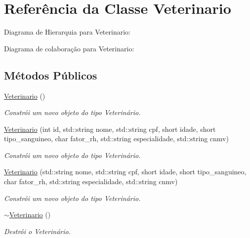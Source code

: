 \hypertarget{classVeterinario}{}\section{Referência da Classe Veterinario}
\label{classVeterinario}


Diagrama de Hierarquia para Veterinario\+:


Diagrama de colaboração para Veterinario\+:
\subsection*{Métodos Públicos}
\begin{DoxyCompactItemize}
\item 
\mbox{\label{classVeterinario_af8dc5f6f77bf8c70dd94d54766764134}} 
\hyperlink{classVeterinario_af8dc5f6f77bf8c70dd94d54766764134}{Veterinario} ()
\begin{DoxyCompactList}\small\item\em Constrói um novo objeto do tipo Veterinário. \end{DoxyCompactList}\item 
\hyperlink{classVeterinario_aff0d07b973488e857d796c98adf9969a}{Veterinario} (int id, std\+::string nome, std\+::string cpf, short idade, short tipo\+\_\+sanguineo, char fator\+\_\+rh, std\+::string especialidade, std\+::string cnmv)
\begin{DoxyCompactList}\small\item\em Constrói um novo objeto do tipo Veterinário. \end{DoxyCompactList}\item 
\hyperlink{classVeterinario_a6430b95484d486ed1add63ad0b767463}{Veterinario} (std\+::string nome, std\+::string cpf, short idade, short tipo\+\_\+sanguineo, char fator\+\_\+rh, std\+::string especialidade, std\+::string cnmv)
\begin{DoxyCompactList}\small\item\em Constrói um novo objeto do tipo Veterinário. \end{DoxyCompactList}\item 
\mbox{\label{classVeterinario_a0de805e30bc7006d2035458f80c18671}} 
\hyperlink{classVeterinario_a0de805e30bc7006d2035458f80c18671}{$\sim$\+Veterinario} ()
\begin{DoxyCompactList}\small\item\em Destrói o Veterinário. \end{DoxyCompactList}\item 

\end{DoxyCompactItemize}
